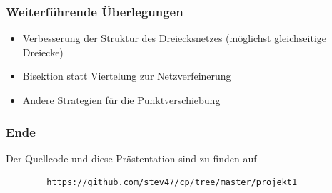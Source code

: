 \documentclass{beamer}
\begin{document}
\begin{frame}
	\frametitle{Weiterführende Überlegungen}	
	\begin{itemize}
		\item
			Verbesserung der Struktur des Dreiecksnetzes (möglichst gleichseitige Dreiecke)
		\item
			Bisektion statt Viertelung zur Netzverfeinerung
		\item
			Andere Strategien für die Punktverschiebung
	\end{itemize}
\end{frame}

\begin{frame}[fragile]
	\frametitle{Ende}
	Der Quellcode und diese Prästentation sind zu finden auf
	\begin{verbatim}
		https://github.com/stev47/cp/tree/master/projekt1
	\end{verbatim}
\end{frame}
\end{document}
